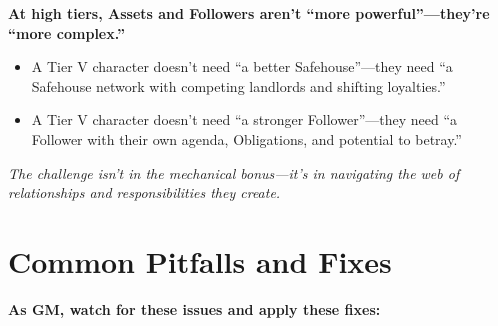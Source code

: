 \begin{tcolorbox}[colback=blue!5!white,colframe=blue!75!black,title={GM Tip: The Scaling Mantra},breakable]
\textbf{At high tiers, Assets and Followers aren't ``more powerful''---they're ``more complex.''}  
\begin{itemize}
  \item A Tier V character doesn't need ``a better Safehouse''---they need ``a Safehouse network with competing landlords and shifting loyalties.''  
  \item A Tier V character doesn't need ``a stronger Follower''---they need ``a Follower with their own agenda, Obligations, and potential to betray.''  
\end{itemize}
\textit{The challenge isn't in the mechanical bonus---it's in navigating the web of relationships and responsibilities they create.}
\end{tcolorbox}

\section{Common Pitfalls and Fixes}
\label{sec:pitfalls}
\textbf{As GM, watch for these issues and apply these fixes:}  

